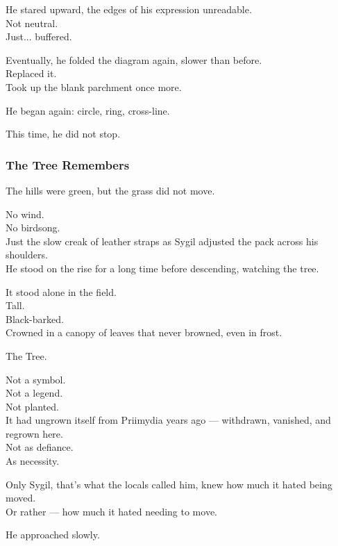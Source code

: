 \documentclass[12pt]{article}
\begin{document}
He stared upward, the edges of his expression unreadable.\\
Not neutral.\\
Just... buffered.

\vspace{1em}

Eventually, he folded the diagram again, slower than before.\\
Replaced it.\\
Took up the blank parchment once more.

He began again: circle, ring, cross-line.

\vspace{1em}

This time, he did not stop.

\dotfill

\subsubsection{The Tree Remembers}

The hills were green, but the grass did not move.

No wind.\\
No birdsong.\\
Just the slow creak of leather straps as Sygil adjusted the pack across his shoulders.\\
He stood on the rise for a long time before descending, watching the tree.

It stood alone in the field.\\
Tall.\\
Black-barked.\\
Crowned in a canopy of leaves that never browned, even in frost.

The Tree.

Not a symbol.\\
Not a legend.\\
Not planted.\\
It had ungrown itself from Priimydia years ago — withdrawn, vanished, and regrown here.\\
Not as defiance.\\
As necessity.

Only Sygil, that’s what the locals called him, knew how much it hated being moved.\\
Or rather — how much it hated needing to move.

\vspace{1em}

He approached slowly.
\end{document}
